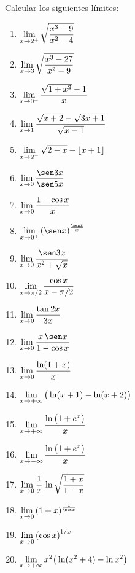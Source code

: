 \item Calcular los siguientes límites:
\begin{multicols}{2}
\begin{enumerate}
    \item $\displaystyle \lim_{x\to 2^+} \sqrt{\frac{x^3-9}{x^2-4}}$
    \item $\displaystyle \lim_{x\to 3} \sqrt{\frac{x^3-27}{x^2-9}}$
    \item $\displaystyle \lim_{x\to 0^+} \frac{\sqrt{1+x^2}-1}{x}$
    \item $\displaystyle \lim_{x\to 1} \frac{\sqrt{x+2}-\sqrt{3x+1}}{\sqrt{x-1}}$
    \item $\displaystyle \lim_{x\to 2^-} \sqrt{2-x}-\lfloor x+1 \rfloor$
    \item $\D \lim_{x\to 0} \frac{\sen 3x}{\sen 5x}$
    \item $\displaystyle \lim_{x\to 0} \frac{1-\cos x}x$
    \item $\D \lim_{x\to 0^+} \left(\sen x\right)^{\frac{\sen x}{x}}$
    \item $\D \lim_{x\to 0} \frac{\sen 3x}{x^2+\sqrt{x}}$
    \item $\displaystyle \lim_{x\to \pi/2} \frac{\cos x}{x-\pi/2}$
    \item $\displaystyle \lim_{x\to 0} \frac{\tan 2x}{3x}$
    \item $\D \lim_{x\to 0} \frac{x\, \sen x}{1-\cos x}$
    \item $\displaystyle \lim_{x\to 0} \frac{\ln(1+x)}{x}$
    \item $\displaystyle \lim_{x\to +\infty} \big(\ln(x+1)-\ln(x+2)\big)$
    \item $\displaystyle \lim_{x\to +\infty} \frac{\ln\big(1+e^x\big)}{x}$
    \item $\displaystyle \lim_{x\to -\infty} \frac{\ln\big(1+e^x\big)}{x}$
    \item $\displaystyle \lim_{x\to 0} \frac1x \, \ln\sqrt{\frac{1+x}{1-x}}$
    \item $\D \lim_{x\to 0} \left(1+x\right)^{\frac1{\sen x}}$
    \item $\displaystyle \lim_{x\to 0} \left(\cos x\right)^{1/x}$
    \item $\displaystyle \lim_{x\to +\infty} x^2 \big(\ln(x^2+4)-\ln x^2\big) $
\end{enumerate}
\end{multicols}

